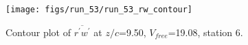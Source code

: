 \begin{figure}[H]
\centering
\texttt{[image: figs/run\_53/run\_53\_rw\_contour]}
\caption{Contour plot of $\overline{r^\prime w^\prime}$ at $z/c$=9.50, $V_{free}$=19.08, station 6.}
\end{figure}


